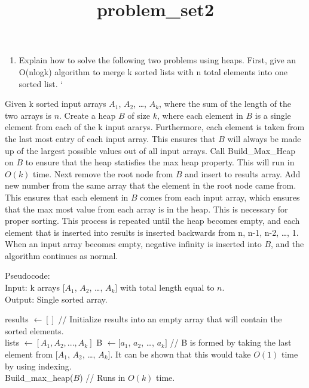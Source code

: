 \documentclass[11pt]{article}
\title{problem\_set2}
\providecommand{\tightlist}{%
      \setlength{\itemsep}{0pt}\setlength{\parskip}{0pt}}
\begin{document}
    
    
    \maketitle
    
    

    
    \begin{enumerate}
\def\labelenumi{\arabic{enumi}.}
\tightlist
\item
  Explain how to solve the following two problems using heaps. First,
  give an O(nlogk) algorithm to merge k sorted lists with n total
  elements into one sorted list. `
\end{enumerate}

    Given k sorted input arrays \(A_{1}\), \(A_{2}\), \ldots, \(A_{k}\),
where the sum of the length of the two arrays is \(n\). Create a heap
\(B\) of size \(k\), where each element in \(B\) is a single element
from each of the k input ararys. Furthermore, each element is taken from
the last most entry of each input array. This ensures that \(B\) will
always be made up of the largest possible values out of all input
arrays. Call Build\_Max\_Heap on \(B\) to ensure that the heap
statisfies the max heap property. This will run in \(O(k)\) time. Next
remove the root node from \(B\) and insert to results array. Add new
number from the same array that the element in the root node came from.
This ensures that each element in \(B\) comes from each input array,
which ensures that the max most value from each array is in the heap.
This is necessary for proper sorting. This process is repeated until the
heap becomes empty, and each element that is inserted into results is
inserted backwards from n, n-1, n-2, \ldots, 1. When an input array
becomes empty, negative infinity is inserted into \(B\), and the
algorithm continues as normal.

Pseudocode:\\
Input: k arrays \([A_{1}\), \(A_{2}\), \ldots, \(A_{k}]\) with total
length equal to \(n\).\\
Output: Single sorted array.

results \(\leftarrow [ ]\) // Initialize results into an empty array
that will contain the sorted elements.\\
lists \(\leftarrow [A_{1}, A_{2}, ..., A_{k}]\) B \(\leftarrow [a_{1}\),
\(a_{2}\), \ldots, \(a_{k}]\) // B is formed by taking the last element
from \([A_{1}\), \(A_{2}\), \ldots, \(A_{k}]\). It can be shown that
this would take \(O(1)\) time by using indexing.\\
Build\_max\_heap(\(B\)) // Runs in \(O(k)\) time.
\end{document}
